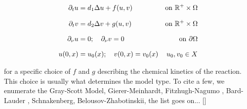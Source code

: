\begin{align}
	\del_t u &= d_1 \lap u + f(u, v) &\text{on} \ \R^{+} \times \Omega \notag \\[0.7em]
	\del_t v &= d_2 \lap v + g(u, v) & \text{on} \ \R^{+} \times \Omega \\[0.7em]
	\del_\nu u & = 0; \quad \del_\nu v = 0 & \text{on} \ \del\Omega \notag \\[0.7em]
	u(0, x) &= u_0(x) ; \quad v(0, x) = v_0(x) & u_0, v_0 \in X
\end{align}
\label{eq:TuringModel}


for a specific choice of $f$ and $g$ describing the chemical kinetics of the reaction. This choice is usually what determines the model type. To cite a few, we enumerate the Gray-Scott Model,  Gierer-Meinhardt, Fitzhugh-Nagumo , Bard-Lauder , Schnakenberg, Belousov-Zhabotinskii, the list goes on... []